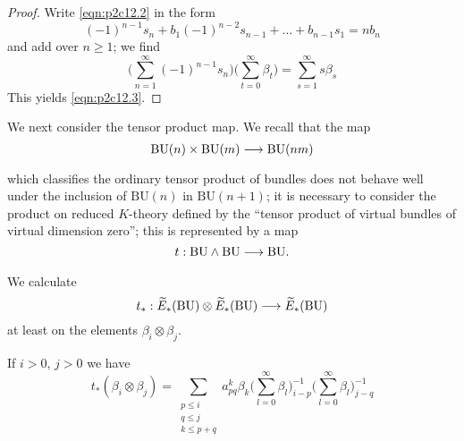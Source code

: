 \documentclass[../main]{subfiles}
\begin{document}
\begin{proof}
Write \eqref{eqn:p2c12.2} in the form \[(-1)^{n-1}s_n + b_1(-1)^{n-2}s_{n-1} + \dots + b_{n-1} s_1 = nb_n\]
and add over $n\ge 1$; we find \[\bigg(\sum^\infty_{n=1}(-1)^{n-1} s_n \bigg)\bigg(\sum^\infty_{t=0}\beta_t\bigg) = \sum^\infty_{s=1}s\beta_s\]
This yields \eqref{eqn:p2c12.3}.
\end{proof}
We next consider the tensor product map. We recall that the map \[ \mathrm{BU}(n)\times \mathrm{BU}(m)\vra{} \mathrm{BU}(nm)\]
which classifies the ordinary tensor product of bundles does not behave well under the inclusion of $ \mathrm{BU}(n)$ in $\mathrm{BU}(n+1)$; it is necessary to consider the product on reduced $K$-theory defined by the ``tensor product of virtual bundles of virtual dimension zero''; this is represented by a map \[t: \mathrm{BU}\wedge \mathrm{BU}\vra{} \mathrm{BU}.\]
We calculate \[t_\ast : \widetilde{E}_\ast(\mathrm{BU})\otimes\widetilde{E}_\ast(\mathrm{BU})\longrightarrow\widetilde{E}_\ast(\mathrm{BU})\] at least on the elements $\beta_i\otimes\beta_j$.
\begin{customprop}{12.4}
\label{prop:p2c12.4}
If $i>0$, $j>0$ we have \begin{equation*}
t_\ast(\beta_i\otimes\beta_j)=\sum_{\substack{p\le i\\ q\le j\\ k\le p+q}} a^k_{pq}\beta_k \bigg(\sum^\infty_{l=0}\beta_l\bigg)^{-1}_{i-p}\bigg(\sum^\infty_{l=0}\beta_l\bigg)^{-1}_{j-q}
\end{equation*}
\end{customprop}
\end{document}
